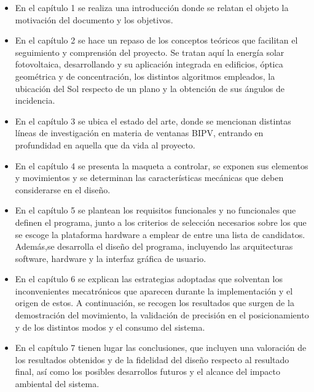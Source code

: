 \begin{itemize}
\item En el capítulo 1 se realiza una introducción donde se relatan el objeto la motivación del documento y los objetivos.%
\item En el capítulo 2 se hace un repaso de los conceptos teóricos que facilitan el seguimiento y comprensión del proyecto. Se tratan aquí la energía solar fotovoltaica, desarrollando y su aplicación integrada en edificios, óptica geométrica y de concentración, los distintos algoritmos empleados, la ubicación del Sol respecto de un plano y la obtención de sus ángulos de incidencia.%
\item En el capítulo 3 se ubica el estado del arte, donde se mencionan distintas líneas de investigación en materia de ventanas BIPV, entrando en profundidad en aquella que da vida al proyecto.
\item En el capítulo 4 se presenta la maqueta a controlar, se exponen sus elementos y movimientos y se determinan las características mecánicas que deben considerarse en el diseño.
\item En el capítulo 5 se plantean los requisitos funcionales y no funcionales que definen el programa, junto a los criterios de selección necesarios sobre los que se escoge la plataforma hardware a emplear de entre una lista de candidatos. Además,se desarrolla el diseño del programa, incluyendo las arquitecturas software, hardware y la interfaz gráfica de usuario.
\item En el capítulo 6 se explican las estrategias adoptadas que solventan los inconvenientes mecatrónicos que aparecen durante la implementación y el origen de estos. A continuación, se recogen los resultados que surgen de la demostración del movimiento, la validación de precisión en el posicionamiento y de los distintos modos y el consumo del sistema.

\item En el capítulo 7 tienen lugar las conclusiones, que incluyen una  valoración de los resultados obtenidos y de la fidelidad del diseño respecto al resultado final, así como los posibles desarrollos futuros y el alcance del impacto ambiental del sistema. 
\end{itemize}

